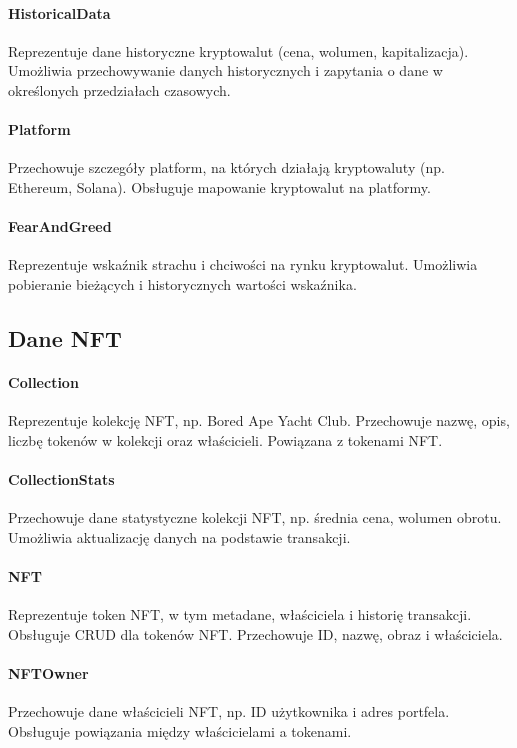 \paragraph{HistoricalData} Reprezentuje dane historyczne kryptowalut (cena, wolumen, kapitalizacja). Umożliwia przechowywanie danych historycznych i zapytania o dane w określonych przedziałach czasowych.

\paragraph{Platform} Przechowuje szczegóły platform, na których działają kryptowaluty (np. Ethereum, Solana). Obsługuje mapowanie kryptowalut na platformy.

\paragraph{FearAndGreed} Reprezentuje wskaźnik strachu i chciwości na rynku kryptowalut. Umożliwia pobieranie bieżących i historycznych wartości wskaźnika.

\subsection{Dane NFT}

\paragraph{Collection} Reprezentuje kolekcję NFT, np. Bored Ape Yacht Club. Przechowuje nazwę, opis, liczbę tokenów w kolekcji oraz właścicieli. Powiązana z tokenami NFT.

\paragraph{CollectionStats} Przechowuje dane statystyczne kolekcji NFT, np. średnia cena, wolumen obrotu. Umożliwia aktualizację danych na podstawie transakcji.

\paragraph{NFT} Reprezentuje token NFT, w tym metadane, właściciela i historię transakcji. Obsługuje CRUD dla tokenów NFT. Przechowuje ID, nazwę, obraz i właściciela.

\paragraph{NFTOwner} Przechowuje dane właścicieli NFT, np. ID użytkownika i adres portfela. Obsługuje powiązania między właścicielami a tokenami.

